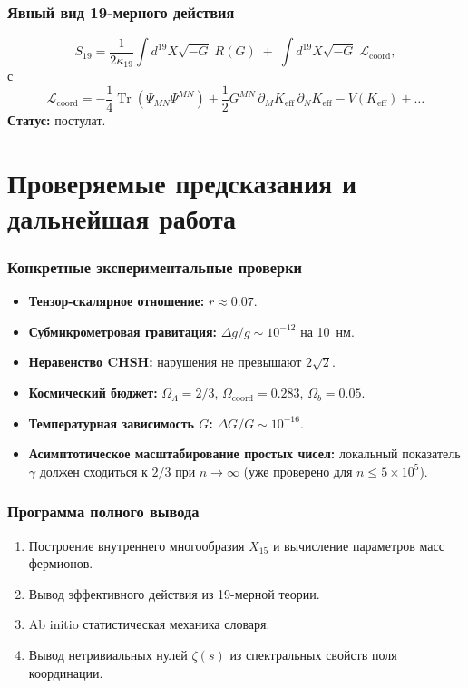 \documentclass[11pt,a4paper]{article}
\DeclareMathOperator{\Tr}{Tr}
\newcommand{\coord}{\mathrm{coord}}
\begin{document}
	\section{Явный вид 19-мерного действия}
	\label{sec:19Dlagrangian}
	\[
	S_{19} = \frac{1}{2\kappa_{19}} \int d^{19}X \sqrt{-G}\; R(G) \;+\; \int d^{19}X \sqrt{-G}\; \mathcal{L}_{\text{coord}},
	\]
	с
	\[
	\mathcal{L}_{\text{coord}} = -\frac{1}{4} \Tr(\Psi_{MN}\Psi^{MN}) + \frac{1}{2} G^{MN}\,\partial_M K_{\mathrm{eff}}\,\partial_N K_{\mathrm{eff}} - V(K_{\mathrm{eff}}) + \dots
	\]
	\textbf{Статус:} постулат.
	
	\part{Проверяемые предсказания и дальнейшая работа}
	
	\section{Конкретные экспериментальные проверки}
	\begin{itemize}
		\item \textbf{Тензор-скалярное отношение:} \(r \approx 0.07\).
		\item \textbf{Субмикрометровая гравитация:} \(\Delta g/g \sim 10^{-12}\) на 10~нм.
		\item \textbf{Неравенство CHSH:} нарушения не превышают \(2\sqrt{2}\).
		\item \textbf{Космический бюджет:} \(\Omega_\Lambda = 2/3\), \(\Omega_{\coord} = 0.283\), \(\Omega_b = 0.05\).
		\item \textbf{Температурная зависимость \(G\):} \(\Delta G/G \sim 10^{-16}\).
		\item \textbf{Асимптотическое масштабирование простых чисел:} локальный показатель \(\gamma\) должен сходиться к \(2/3\) при \(n\to\infty\) (уже проверено для \(n\le 5\times10^5\)).
	\end{itemize}
	
	\section{Программа полного вывода}
	\begin{enumerate}
		\item Построение внутреннего многообразия \(X_{15}\) и вычисление параметров масс фермионов.
		\item Вывод эффективного действия из 19-мерной теории.
		\item Ab initio статистическая механика словаря.
		\item Вывод нетривиальных нулей \(\zeta(s)\) из спектральных свойств поля координации.
	\end{enumerate}
	
\end{document}
